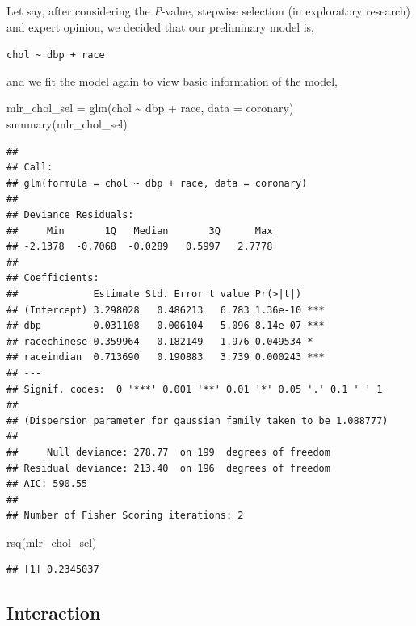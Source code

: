 \documentclass[
  10pt,
]{krantz}
\newenvironment{Shaded}{\begin{snugshade}}{\end{snugshade}}
\newcommand{\AttributeTok}[1]{\textcolor[rgb]{0.77,0.63,0.00}{#1}}
\newcommand{\FunctionTok}[1]{\textcolor[rgb]{0.00,0.00,0.00}{#1}}
\newcommand{\NormalTok}[1]{#1}
\newcommand{\OtherTok}[1]{\textcolor[rgb]{0.56,0.35,0.01}{#1}}
\newcommand{\SpecialCharTok}[1]{\textcolor[rgb]{0.00,0.00,0.00}{#1}}
\begin{document}
Let say, after considering the \emph{P}-value, stepwise selection (in exploratory research) and expert opinion, we decided that our preliminary model is,

\texttt{chol\ \textasciitilde{}\ dbp\ +\ race}

and we fit the model again to view basic information of the model,

\begin{Shaded}
\begin{Highlighting}[]
\NormalTok{mlr\_chol\_sel }\OtherTok{=} \FunctionTok{glm}\NormalTok{(chol }\SpecialCharTok{\textasciitilde{}}\NormalTok{ dbp }\SpecialCharTok{+}\NormalTok{ race, }\AttributeTok{data =}\NormalTok{ coronary)}
\FunctionTok{summary}\NormalTok{(mlr\_chol\_sel)}
\end{Highlighting}
\end{Shaded}

\begin{verbatim}
## 
## Call:
## glm(formula = chol ~ dbp + race, data = coronary)
## 
## Deviance Residuals: 
##     Min       1Q   Median       3Q      Max  
## -2.1378  -0.7068  -0.0289   0.5997   2.7778  
## 
## Coefficients:
##             Estimate Std. Error t value Pr(>|t|)    
## (Intercept) 3.298028   0.486213   6.783 1.36e-10 ***
## dbp         0.031108   0.006104   5.096 8.14e-07 ***
## racechinese 0.359964   0.182149   1.976 0.049534 *  
## raceindian  0.713690   0.190883   3.739 0.000243 ***
## ---
## Signif. codes:  0 '***' 0.001 '**' 0.01 '*' 0.05 '.' 0.1 ' ' 1
## 
## (Dispersion parameter for gaussian family taken to be 1.088777)
## 
##     Null deviance: 278.77  on 199  degrees of freedom
## Residual deviance: 213.40  on 196  degrees of freedom
## AIC: 590.55
## 
## Number of Fisher Scoring iterations: 2
\end{verbatim}

\begin{Shaded}
\begin{Highlighting}[]
\FunctionTok{rsq}\NormalTok{(mlr\_chol\_sel)}
\end{Highlighting}
\end{Shaded}

\begin{verbatim}
## [1] 0.2345037
\end{verbatim}

\hypertarget{interaction}{%
\subsection{\texorpdfstring{Interaction}{Interaction}}\label{interaction}}
\end{document}
